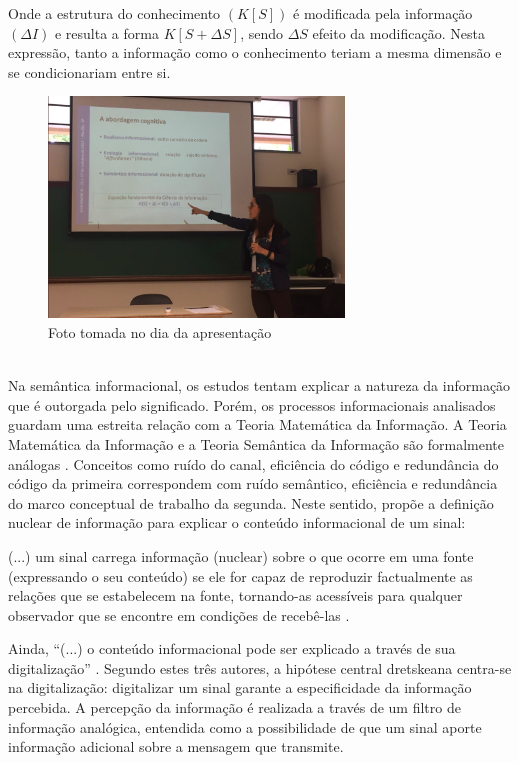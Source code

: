 \documentclass[a4paper,11pt]{article}
\begin{document}
Onde a estrutura do conhecimento  $(K[S])$ é modificada pela informação $(\Delta I)$ e resulta a forma $K[S + \Delta S]$, sendo $\Delta S$ efeito da modificação. Nesta expressão, tanto a informação como o conhecimento teriam a mesma dimensão e se condicionariam entre si. \\
\begin{figure}[h]
\centering
\includegraphics[width=0.7\textwidth]{./foto1}
\caption{Foto tomada no dia da apresentação} \label{fig:foto1}
\end{figure}\\

Na semântica informacional, os estudos tentam explicar a natureza da informação que é outorgada pelo significado. Porém, os processos informacionais analisados guardam uma estreita relação com a Teoria Matemática da Informação. A Teoria Matemática da Informação e a Teoria Semântica da Informação são formalmente análogas \cite{bar}. Conceitos como ruído do canal, eficiência do código e redundância do código da primeira correspondem com ruído semântico, eficiência e redundância do marco conceptual de trabalho da segunda. Neste sentido, \cite{dre} propõe a definição nuclear de informação para explicar o conteúdo informacional de um sinal:
\begin{center}
    \begin{minipage}{0.7\linewidth}
        \vspace{5pt}
        {\small 
          (...) um sinal carrega informação (nuclear) sobre o que ocorre em uma fonte (expressando o seu conteúdo) se ele for capaz de reproduzir factualmente as relações que se estabelecem na fonte, tornando-as acessíveis para qualquer observador que se encontre em condições de recebê-las \cite[p. 9]{gon}.
        }
        \vspace{5pt}
    \end{minipage}
\end{center}
Ainda, “(...) o conteúdo informacional pode ser explicado a través de sua digitalização” \cite[p. 9]{gon}. Segundo estes três autores, a hipótese central dretskeana centra-se na digitalização: digitalizar um sinal garante a especificidade da informação percebida. A percepção da informação é realizada a través de um filtro de informação analógica, entendida como a possibilidade de que um sinal aporte informação adicional sobre a mensagem que transmite.
\end{document}
